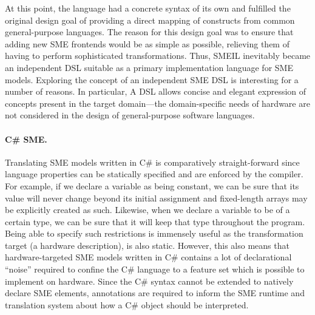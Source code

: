 At this point, the language had a concrete syntax of its own and fulfilled the
original design goal of providing a direct mapping of constructs from common
general-purpose languages. The reason for this design goal was to ensure that
adding new SME frontends would be as simple as possible, relieving them of
having to perform sophisticated transformations. Thus, SMEIL inevitably became
an independent DSL suitable as a primary implementation language for SME
models. Exploring the concept of an independent SME DSL is interesting for a
number of reasons. In particular, A DSL allows concise and elegant expression of
concepts present in the target domain---the domain-specific needs of hardware
are not considered in the design of general-purpose software languages.

\paragraph{C\# SME.}
Translating SME models written in C\# is comparatively straight-forward since
language properties can be statically specified and are enforced by the
compiler. For example, if we declare a variable as being constant, we can be
sure that its value will never change beyond its initial assignment and
fixed-length arrays may be explicitly created as such. Likewise, when we declare
a variable to be of a certain type, we can be sure that it will keep that type
throughout the program. Being able to specify such restrictions is immensely
useful as the transformation target (a hardware description), is also
static. However, this also means that hardware-targeted SME models written in
C\# contains a lot of declarational ``noise'' required to confine the C\#
language to a feature set which is possible to implement on hardware. Since the
C\# syntax cannot be extended to natively declare SME elements, annotations are
required to inform the SME runtime and translation system about how a C\# object
should be interpreted.


